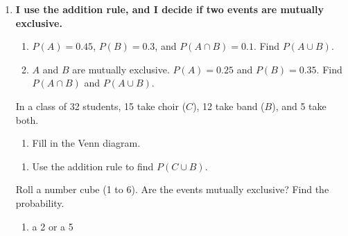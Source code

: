 \documentclass[11pt]{article}
\newcommand{\goal}[1]{\textbf{#1}\par\vspace{0.35em}}
\begin{document}
\begin{enumerate}
\begin{enumerate}[start=3]
  \work{3em}
\end{enumerate}

\newpage
\item \goal{I use the addition rule, and I decide if two events are mutually exclusive.}
\begin{enumerate}
  \item $P(A) = 0.45$, \; $P(B) = 0.3$, and $P(A \cap B) = 0.1$. Find $P(A \cup B)$.

  \work{2.5em}
  \item $A$ and $B$ are mutually exclusive. $P(A) = 0.25$ and $P(B) = 0.35$. Find $P(A \cap B)$ and $P(A \cup B)$.

  \work{2.5em}
\end{enumerate}

\vspace{0.4em}
In a class of 32 students, 15 take choir ($C$), 12 take band ($B$), and 5 take both.

\begin{minipage}[t]{0.45\linewidth}\vspace{0pt}\raggedright
\begin{enumerate}[start=3]
  \item Fill in the Venn diagram.

  \vspace{0.3em}
\end{enumerate}
\end{minipage}\hfill
\begin{minipage}[t]{0.52\linewidth}\vspace{0pt}\raggedright
\begin{enumerate}[start=4]
  \item Use the addition rule to find $P(C \cup B)$.

\end{enumerate}
\end{minipage}

\vspace{1.2em}
Roll a number cube (1 to 6). Are the events mutually exclusive? Find the probability.
\begin{enumerate}[start=5]
  \item a 2 or a 5


\end{enumerate}
\end{enumerate}
\end{document}
